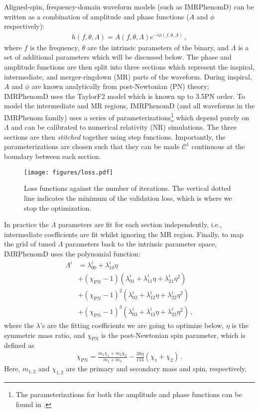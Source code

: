 \documentclass[twocolumn]{aastex631}
\begin{document}
Aligned-spin, frequency-domain waveform models (such as IMRPhenomD) can be written as a
combination of amplitude and phase functions ($A$ and $\phi$ respectively):
\begin{align}\label{eq:}
	h(f,\theta,\Lambda) = A(f,\theta,\Lambda)e^{-i\phi(f,\theta,\Lambda)}\,,
\end{align}
where $f$ is the frequency, $\theta$ are the intrinsic parameters of the binary, and $\Lambda$ is a set of additional
parameters which will be discussed below. 
The phase and amplitude functions are then split into three sections which represent the
inspiral, intermediate, and merger-ringdown (MR) parts of the waveform. 
During inspiral, $A$ and $\phi$ are known analytically from post-Newtonian (PN) theory;
IMRPhenomD uses the TaylorF2 model \citep{Buonanno:2009zt, Arun:2004hn} which is known up to 3.5PN order.
To model the intermediate and MR regions, IMRPhenomD (and all waveforms in the IMRPhenom family)
uses a series of parameterizations\footnote{
	The parameterizations for both the amplitude and phase functions can be found in \citep{khan2016frequency}.
} 
which depend purely on $\Lambda$ and can be calibrated to numerical relativity (NR) simulations.
The three sections are then \textit{stitched} together using step functions.
Importantly, the parameterizations are chosen such that they can be made $\mathcal{C}^1$ continuous at the
boundary between each section.

\begin{figure}
	\centering
	\texttt{[image: figures/loss.pdf]}
	\caption{Loss functions against the number of iterations. The vertical
	dotted line indicates the minimum of the validation loss, which is where we stop
	the optimization.}
	\label{fig:loss}
\end{figure}

In practice the $\Lambda$ parameters are fit for each section independently, i.e., intermediate coefficients are fit whilst ignoring the MR region.
Finally, to map the grid of tuned $\Lambda$ parameters back to the intrinsic parameter space, IMRPhenomD uses the polynomial function:
\begin{align} \label{eq:Lambda}
	\Lambda^i&=\lambda_{00}^i+\lambda_{10}^i\eta \nonumber \\
	&+(\chi_{\mathrm{PN}}-1)(\lambda_{01}^i+\lambda_{11}^i\eta+\lambda_{21}^i\eta^2) \nonumber \\ 
	&+(\chi_{\mathrm{PN}}-1)^2(\lambda_{02}^i+\lambda_{12}^i\eta+\lambda_{22}^i\eta^2) \nonumber \\
	&+(\chi_{\mathrm{PN}}-1)^3(\lambda_{03}^i+\lambda_{13}^i\eta+\lambda_{23}^i\eta^2)\,,
\end{align}
where the $\lambda$'s are the fitting coefficients we are going to optimize below, $\eta$ is
the symmetric mass ratio, and $\chi_{\mathrm{PN}}$ is the post-Newtonian spin
parameter, which is defined as 
\begin{align}
	\chi_{\mathrm{PN}}=\frac{m_1\chi_1+m_2\chi_2}{m_1+m_2}-\frac{38\eta}{113}(\chi_1+\chi_2)\,.
\end{align}
Here, $m_{1,2}$ and $\chi_{1,2}$ are the primary and secondary mass and spin,
respectively. 
\end{document}
